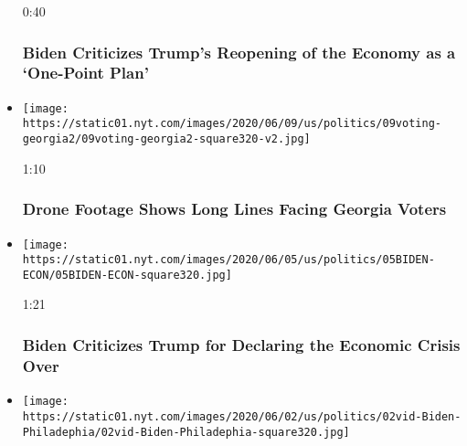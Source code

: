 \begin{itemize}
  0:40

  \hypertarget{biden-criticizes-trumps-reopening-of-the-economy-as-a-one-point-plan}{%
  \subsubsection{Biden Criticizes Trump's Reopening of the Economy as a
  `One-Point
  Plan'}\label{biden-criticizes-trumps-reopening-of-the-economy-as-a-one-point-plan}}
\item
  \href{https://www.nytimes.com/video/us/100000007182268/georgia-election-day-atlanta.html?action=click\&module=video-series-bar\&region=header\&pgtype=Article\&playlistId=video/2020-Elections}{}

  \texttt{[image: https://static01.nyt.com/images/2020/06/09/us/politics/09voting-georgia2/09voting-georgia2-square320-v2.jpg]}

  1:10

  \hypertarget{drone-footage-shows-long-lines-facing-georgia-voters}{%
  \subsubsection{Drone Footage Shows Long Lines Facing Georgia
  Voters}\label{drone-footage-shows-long-lines-facing-georgia-voters}}
\item
  \href{https://www.nytimes.com/video/us/100000007177074/biden-trump-economy-george-floyd.html?action=click\&module=video-series-bar\&region=header\&pgtype=Article\&playlistId=video/2020-Elections}{}

  \texttt{[image: https://static01.nyt.com/images/2020/06/05/us/politics/05BIDEN-ECON/05BIDEN-ECON-square320.jpg]}

  1:21

  \hypertarget{biden-criticizes-trump-for-declaring-the-economic-crisis-over}{%
  \subsubsection{Biden Criticizes Trump for Declaring the Economic
  Crisis
  Over}\label{biden-criticizes-trump-for-declaring-the-economic-crisis-over}}
\item
  \href{https://www.nytimes.com/video/us/elections/100000007169461/watch-live-biden-visits-philadelphia.html?action=click\&module=video-series-bar\&region=header\&pgtype=Article\&playlistId=video/2020-Elections}{}

  \texttt{[image: https://static01.nyt.com/images/2020/06/02/us/politics/02vid-Biden-Philadephia/02vid-Biden-Philadephia-square320.jpg]}


\end{itemize}
